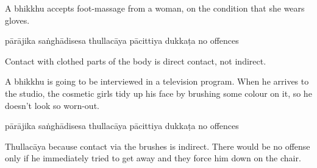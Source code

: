 \begin{exam}{\autoExamName}
\begin{problem*}
\begin{parts}
  \bigskip

  \item A bhikkhu accepts foot-massage from a woman, on the condition that she wears gloves.

  \bigskip

  \begin{answers}{6}
    \bChoices
     pārājika\eAns
     saṅghādisesa\eAns
     thullacāya\eAns
     pācittiya\eAns
     dukkaṭa\eAns
     no offences\eAns
    \eChoices
  \end{answers}

  \begin{solution}
    Contact with clothed parts of the body is direct contact, not indirect.
  \end{solution}

  \bigskip

  \item A bhikkhu is going to be interviewed in a television program. When he
    arrives to the studio, the cosmetic girls tidy up his face by brushing some
    colour on it, so he doesn't look so worn-out.

  \bigskip

  \begin{answers}{6}
    \bChoices
     pārājika\eAns
     saṅghādisesa\eAns
     thullacāya\eAns
     pācittiya\eAns
     dukkaṭa\eAns
     no offences\eAns
    \eChoices
  \end{answers}

  \begin{solution}
    Thullacāya because contact via the brushes is indirect.
    There would be no offense only if he immediately tried to get away and they force him down on the chair.
  \end{solution}

  \end{parts}

\end{problem*}

\end{exam}
